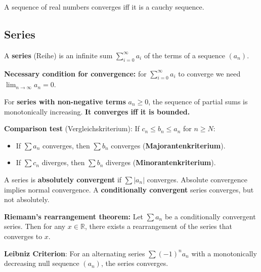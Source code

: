 \begin{theorem}
A sequence of real numbers converges iff it is a cauchy sequence.
\end{theorem}

\subsection{Series}

\begin{definition}
A \textbf{series} (Reihe) is an infinite sum $\sum_{i=0}^\infty a_i$ of the terms of a sequence $(a_n)$.
\end{definition}

\begin{theorem}
\textbf{Necessary condition for convergence:} for $\sum_{i=0}^\infty a_i$ to converge we need $\lim_{n \to \infty} a_n = 0$.
\end{theorem}

\begin{theorem}
For \textbf{series with non-negative terms} $a_n \ge 0$, the sequence of partial sums is monotonically increasing. \textbf{It converges iff it is bounded.}
\end{theorem}

\begin{theorem}
\textbf{Comparison test} (Vergleichskriterium): If $c_n \le b_n \le a_n$ for $n \ge N$:
\begin{itemize}
    \item If $\sum a_n$ converges, then $\sum b_n$ converges (\textbf{Majorantenkriterium}).
    \item If $\sum c_n$ diverges, then $\sum b_n$ diverges (\textbf{Minorantenkriterium}).
\end{itemize}
\end{theorem}

\begin{definition}
A series is \textbf{absolutely convergent} if $\sum |a_n|$ converges. Absolute convergence implies normal convergence.
A \textbf{conditionally convergent} series converges, but not absolutely.
\end{definition}

\begin{theorem}
\textbf{Riemann's rearrangement theorem:}
Let $\sum a_n$ be a conditionally convergent series. Then for any $x \in \mathbb{R}$, there exists a rearrangement of the series that converges to $x$.
\end{theorem}

\begin{theorem}
\textbf{Leibniz Criterion}: For an alternating series $\sum (-1)^n a_n$ with a monotonically decreasing null sequence $(a_n)$, the series converges.
\end{theorem}


